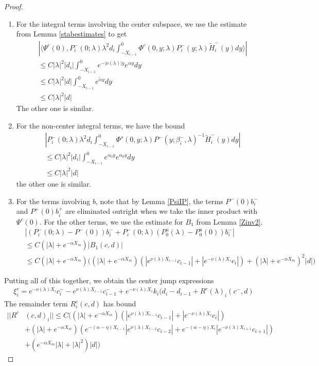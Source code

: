 \documentclass[thesis.tex]{subfiles}
\begin{document}
\begin{lemma}
\begin{proof}
\begin{enumerate}
\item For the integral terms involving the center subspace, we use the estimate from Lemma \ref{stabestimates} to get 
\begin{align*}
&\left| \langle \Psi^c(0), P_i^-(0; \lambda) \lambda^2 d_i \int_{-X_{i-1}}^0 \Phi^c(0, y; \lambda) P_i^-(y; \lambda) \tilde{H}_i^-(y) dy \rangle \right| \\
&\leq C |\lambda|^2 |d_i| \int_{-X_{i-1}}^0 e^{-|\nu(\lambda)|y}e^{\alpha y} dy \\
&\leq C |\lambda|^2 |d| \int_{-X_{i-1}}^0 e^{\tilde{\alpha} y} dy \\
&\leq C |\lambda|^2 |d|
\end{align*}
The other one is similar.

\item For the non-center integral terms, we have the bound
\begin{align*}
&\left| P_i^-(0; \lambda) \lambda^2 d_i
\int_{-X_{i-1}}^0 \Phi^s(0, y; \lambda) P^-(y; \beta_i^-, \lambda)^{-1} \tilde{H}_i^-(y) dy \right| \\
&\leq C |\lambda|^2 |d_i| \int_{-X_{i-1}}^0 e^{\alpha_0 y} e^{\alpha_0 y} dy \\
&\leq C |\lambda|^2 |d|
\end{align*}
the other one is similar.

\item For the terms involving $b$, note that by Lemma \ref{PsiIP}, the terms $P^-(0) b_i^-$ and $P^+(0)b_i^+$ are eliminated outright when we take the inner product with $\Psi^c(0)$. For the other terms, we use the estimate for $B_1$ from Lemma \ref{Zinv2}.
\begin{align*}
&|(P_i^-(0; \lambda) - P^-(0))b_i^- + P_i^-(0; \lambda)(P_0^u(\lambda) - P_0^u(0))b_i^-| \\
&\leq C(|\lambda| + e^{-\alpha X_m}) |B_1(c, d)| \\
&\leq C(|\lambda| + e^{-\alpha X_m}) \Big( (|\lambda| + e^{-\alpha X_m})(|e^{\nu(\lambda)X_{i-1}}c_{i-1}| + |e^{-\nu(\lambda)X_i}c_i|)+ (|\lambda| + e^{-\alpha X_m})^2 |d| \Big)
\end{align*}
\end{enumerate}

Putting all of this together, we obtain the center jump expressions
\begin{align*}
\xi^c_i = e^{-\nu(\lambda) X_i} c_i^- - e^{\nu(\lambda) X_{i-1}} c_{i-1}^- + e^{-\nu(\lambda) X_i} k_i (d_i - d_{i-1} + R^c(\lambda)_i(c^-, d)
\end{align*}
The remainder term $R^c_i(c, d)$ has bound
\begin{align*}
||R^c&(c, d)_i|| \leq C \Big(
(|\lambda| + e^{-\alpha X_m})(|e^{\nu(\lambda)X_{i-1}}c_{i-1}| + |e^{-\nu(\lambda)X_i}c_i|) \\
&+ (|\lambda| + e^{-\alpha X_m})( e^{-(\alpha - \eta) X_{i-1}} |e^{\nu(\lambda)X_{i-2}}c_{i-2}| + e^{-(\alpha - \eta) X_i} |e^{-\nu(\lambda)X_{i+1}}c_{i+1}|)  \\
&+ (e^{-\alpha X_m}|\lambda| + |\lambda|^2) |d|
\Big)
\end{align*}


\end{proof}
\end{lemma}
\end{document}
